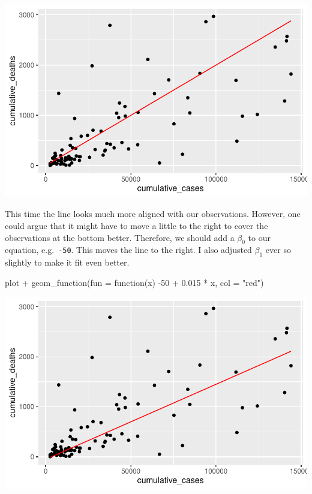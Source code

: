 \documentclass[
  letterpaper,
]{krantz}
\makeatletter
\newenvironment{Shaded}{\begin{snugshade}}{\end{snugshade}}
\newcommand{\AttributeTok}[1]{\textcolor[rgb]{0.40,0.45,0.13}{#1}}
\newcommand{\ControlFlowTok}[1]{\textcolor[rgb]{0.00,0.23,0.31}{#1}}
\newcommand{\DecValTok}[1]{\textcolor[rgb]{0.68,0.00,0.00}{#1}}
\newcommand{\FloatTok}[1]{\textcolor[rgb]{0.68,0.00,0.00}{#1}}
\newcommand{\FunctionTok}[1]{\textcolor[rgb]{0.28,0.35,0.67}{#1}}
\newcommand{\NormalTok}[1]{\textcolor[rgb]{0.00,0.23,0.31}{#1}}
\newcommand{\SpecialCharTok}[1]{\textcolor[rgb]{0.37,0.37,0.37}{#1}}
\newcommand{\StringTok}[1]{\textcolor[rgb]{0.13,0.47,0.30}{#1}}
\newenvironment{kframe}{%
\medskip{}
\setlength{\fboxsep}{.8em}
 \def\at@end@of@kframe{}%
 \ifinner\ifhmode%
  \def\at@end@of@kframe{\end{minipage}}%
  \begin{minipage}{\columnwidth}%
 \fi\fi%
 \def\FrameCommand##1{\hskip\@totalleftmargin \hskip-\fboxsep
 \colorbox{shadecolor}{##1}\hskip-\fboxsep
     \hskip-\linewidth \hskip-\@totalleftmargin \hskip\columnwidth}%
 \MakeFramed {\advance\hsize-\width
   \@totalleftmargin\z@ \linewidth\hsize
   \@setminipage}}%
 {\par\unskip\endMakeFramed%
 \at@end@of@kframe}
\renewenvironment{Shaded}{\begin{kframe}}{\end{kframe}}
\makeatother
\begin{document}
\includegraphics{13_regressions_files/figure-pdf/fitting-model-by-hand-step-five-1.pdf}

This time the line looks much more aligned with our observations.
However, one could argue that it might have to move a little to the
right to cover the observations at the bottom better. Therefore, we
should add a \(\beta_0\) to our equation, e.g.~\texttt{-50}. This moves
the line to the right. I also adjusted \(\beta_1\) ever so slightly to
make it fit even better.

\begin{Shaded}
\begin{Highlighting}[]
\NormalTok{plot }\SpecialCharTok{+}
  \FunctionTok{geom\_function}\NormalTok{(}\AttributeTok{fun =} \ControlFlowTok{function}\NormalTok{(x) }\SpecialCharTok{{-}}\DecValTok{50} \SpecialCharTok{+} \FloatTok{0.015} \SpecialCharTok{*}\NormalTok{ x, }\AttributeTok{col =} \StringTok{"red"}\NormalTok{)}
\end{Highlighting}
\end{Shaded}

\includegraphics{13_regressions_files/figure-pdf/fitting-model-by-hand-step-six-1.pdf}
\end{document}
